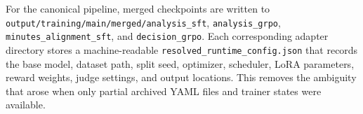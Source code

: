 For the canonical pipeline, merged checkpoints are written to \texttt{output/training/main/merged/analysis\_sft}, \texttt{analysis\_grpo}, \texttt{minutes\_alignment\_sft}, and \texttt{decision\_grpo}. Each corresponding adapter directory stores a machine-readable \texttt{resolved\_runtime\_config.json} that records the base model, dataset path, split seed, optimizer, scheduler, LoRA parameters, reward weights, judge settings, and output locations. This removes the ambiguity that arose when only partial archived YAML files and trainer states were available.



